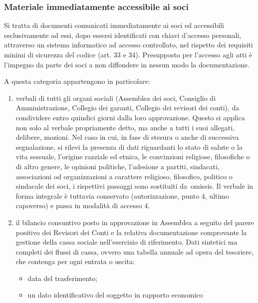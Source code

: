 \subsubsection{Materiale immediatamente accessibile ai soci}\label{materiale-comunicato-ai-soci}

Si tratta di documenti comunicati immediatamente ai soci ed accessibili
esclusivamente ad essi, dopo essersi identificati con chiavi d’accesso
personali, attraverso un sistema informatico ad accesso controllato, nel
rispetto dei requisiti minimi di sicurezza del codice (art. 33 e 34).
Presupposto per l’accesso agli atti è l’impegno da parte dei soci a non
diffondere in nessun modo la documentazione.  

A questa categoria appartengono in particolare:

\begin{enumerate}
    \item verbali di tutti gli organi sociali (Assemblea dei soci, Consiglio
        di Amministrazione, Collegio dei garanti, Collegio dei revisori dei
        conti), da condividere entro quindici giorni dalla loro
        approvazione. Questo si applica non solo al verbale propriamente
        detto, ma anche a tutti i suoi allegati, delibere, mozioni.
        Nel caso in cui, in fase di stesura o anche di successiva segnalazione, si
        rilevi la presenza di dati riguardanti lo stato di salute o la vita
        sessuale, l’origine razziale ed etnica, le convinzioni religiose,
        filosofiche o di altro genere, le opinioni politiche, l’adesione a partiti,
        sindacati, associazioni od organizzazioni a carattere religioso, filosofico,
        politico o sindacale dei soci, i rispettivi passaggi sono sostituiti
        da omissis. Il verbale in forma integrale è tuttavia conservato
        (autorizzazione, punto 4, ultimo capoverso) e passa in modalità di accesso
        4.
    \item il bilancio consuntivo posto in approvazione in Assemblea a seguito
        del parere positivo dei Revisori dei Conti e la relativa
        documentazione comprovante la gestione della cassa sociale
        nell’esercizio di riferimento. 
        Dati sintetici ma completi dei flussi di cassa, ovvero una tabella
        annuale ad opera del tesoriere, che contenga per ogni entrata o uscita:
        \begin{itemize}
            \item data del trasferimento;
            \item un dato identificativo del soggetto in rapporto economico

\end{itemize}
\end{enumerate}
